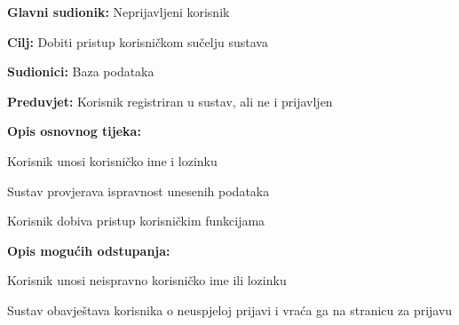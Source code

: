 					
					
					
					
					
					
					
					\noindent {}
					\begin{packed_item}
	
						\item \textbf{Glavni sudionik:} Neprijavljeni korisnik
						\item  \textbf{Cilj:} Dobiti pristup korisničkom sučelju sustava
						\item  \textbf{Sudionici:} Baza podataka
						\item  \textbf{Preduvjet:} Korisnik registriran u sustav, ali ne i prijavljen
						\item  \textbf{Opis osnovnog tijeka:}
						
						\item[] \begin{packed_enum}
	
							\item Korisnik unosi korisničko ime i lozinku
							\item Sustav provjerava ispravnost unesenih podataka
							\item Korisnik dobiva pristup korisničkim funkcijama 
	
						\end{packed_enum}
						
						\item  \textbf{Opis mogućih odstupanja:}
						
						\item[] \begin{packed_item}
	
							\item[2.a] Korisnik unosi neispravno korisničko ime ili lozinku
							\item[] \begin{packed_enum}
								\item Sustav obavještava korisnika o neuspjeloj prijavi i vraća ga na stranicu za prijavu
							\end{packed_enum}
							
						\end{packed_item}
					\end{packed_item}
					
					
					
					
					
					
					
